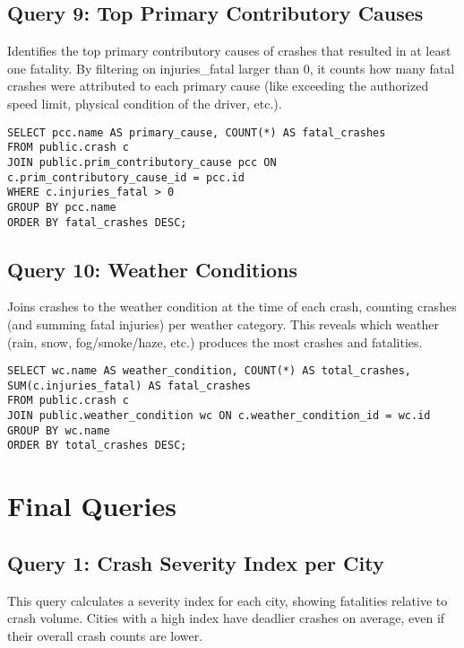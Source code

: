 \documentclass[12pt]{article}
\begin{document}
\subsection{Query 9: Top Primary Contributory Causes}

Identifies the top primary contributory causes of crashes that resulted in at least one fatality. By filtering on injuries\_fatal larger than 0, it counts how many fatal crashes were attributed to each primary cause (like exceeding the authorized speed limit, physical condition of the driver, etc.).

{\scriptsize
\begin{verbatim}
SELECT pcc.name AS primary_cause, COUNT(*) AS fatal_crashes
FROM public.crash c
JOIN public.prim_contributory_cause pcc ON c.prim_contributory_cause_id = pcc.id
WHERE c.injuries_fatal > 0
GROUP BY pcc.name
ORDER BY fatal_crashes DESC;
\end{verbatim}}



\subsection{Query 10: Weather Conditions}

Joins crashes to the weather condition at the time of each crash, counting crashes (and summing fatal injuries) per weather category. This reveals which weather (rain, snow, fog/smoke/haze, etc.) produces the most crashes and fatalities. 

{\scriptsize
\begin{verbatim}
SELECT wc.name AS weather_condition, COUNT(*) AS total_crashes, SUM(c.injuries_fatal) AS fatal_crashes
FROM public.crash c
JOIN public.weather_condition wc ON c.weather_condition_id = wc.id
GROUP BY wc.name
ORDER BY total_crashes DESC;
\end{verbatim}}


\section{Final Queries}

\subsection{Query 1: Crash Severity Index per City}

This query calculates a severity index for each city, showing fatalities relative to crash volume. Cities with a high index have deadlier crashes on average, even if their overall crash counts are lower.
\end{document}
